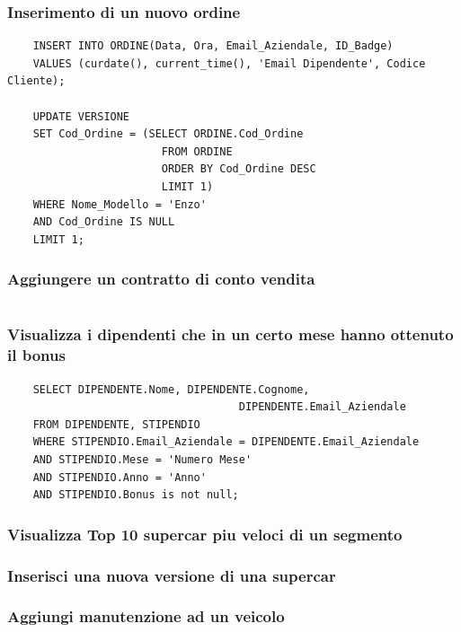 \documentclass[11pt]{article}
\begin{document}
\subsubsection*{Inserimento di un nuovo ordine}
\begin{lstlisting}
    INSERT INTO ORDINE(Data, Ora, Email_Aziendale, ID_Badge) 
    VALUES (curdate(), current_time(), 'Email Dipendente', Codice Cliente);

    UPDATE VERSIONE
    SET Cod_Ordine = (SELECT ORDINE.Cod_Ordine
                        FROM ORDINE
                        ORDER BY Cod_Ordine DESC
                        LIMIT 1)
    WHERE Nome_Modello = 'Enzo'
    AND Cod_Ordine IS NULL
    LIMIT 1;
\end{lstlisting}

\subsubsection*{Aggiungere un contratto di conto vendita}
\begin{lstlisting}

\end{lstlisting}

\subsubsection*{Visualizza i dipendenti che in un certo mese hanno ottenuto il
bonus}

\begin{lstlisting}
    SELECT DIPENDENTE.Nome, DIPENDENTE.Cognome, 
                                    DIPENDENTE.Email_Aziendale 
    FROM DIPENDENTE, STIPENDIO
    WHERE STIPENDIO.Email_Aziendale = DIPENDENTE.Email_Aziendale
    AND STIPENDIO.Mese = 'Numero Mese'
    AND STIPENDIO.Anno = 'Anno'
    AND STIPENDIO.Bonus is not null;
\end{lstlisting}

\subsubsection*{Visualizza Top 10 supercar piu veloci di un segmento}

\subsubsection*{Inserisci una nuova versione di una supercar}

\subsubsection*{Aggiungi manutenzione ad un veicolo}
\end{document}

